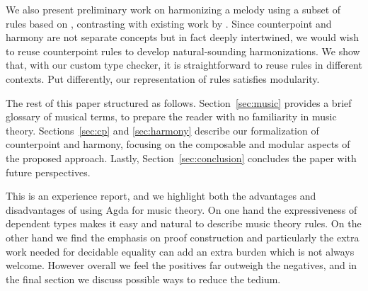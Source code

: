 
We also present preliminary work on harmonizing a melody using
a subset of rules based on \citet{piston-harmony}, contrasting with
existing work by \citet{koops-fharm}. Since counterpoint and
harmony are not separate concepts but in fact deeply intertwined, we
would wish to reuse counterpoint rules to develop natural-sounding
harmonizations.  We show that, with our custom type checker, it is
straightforward to reuse rules in different contexts.  Put differently,
our representation of rules satisfies modularity.

The rest of this paper structured as follows.  Section~\ref{sec:music}
provides a brief glossary of musical terms, to prepare the
reader with no familiarity in music theory.  Sections~\ref{sec:cp} and
\ref{sec:harmony} describe our formalization of counterpoint and
harmony, focusing on the composable and modular aspects of the
proposed approach.  Lastly, Section~\ref{sec:conclusion} concludes
the paper with future perspectives.

This is an experience report, and we highlight both the advantages and
disadvantages of using Agda for music theory. On one hand the
expressiveness of dependent types makes it easy and natural to
describe music theory rules. On the other hand we find the emphasis on proof
construction and particularly the extra work needed for decidable
equality can add an extra burden which is not always welcome. However
overall we feel the positives far outweigh the negatives, and in the
final section we discuss possible ways to reduce the tedium.

